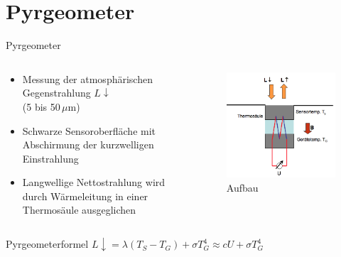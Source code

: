 \documentclass{beamer}
\begin{document}
\section{Pyrgeometer}
\begin{frame}{Pyrgeometer}
\begin{columns}
\begin{column}{0.6\textwidth}
\begin{itemize}
  \vfill\item Messung der atmosphärischen Gegenstrahlung $L\downarrow$\\
              (5 bis 50\,$\mu$m)
  \vfill\item Schwarze Sensoroberfläche mit Abschirmung der kurzwelligen Einstrahlung
  \vfill\item Langwellige Nettostrahlung wird durch Wärmeleitung in einer Thermosäule ausgeglichen
\vfill
\end{itemize}
\end{column}

\begin{column}{0.4\textwidth}
\begin{figure}[ht]
    \centering
    \includegraphics[width=1\textwidth]{figures/pyrgeometer_funktion.png}
    \caption{Aufbau}
    \label{fig:pyrgeometer_funktion}
\end{figure}
\end{column}
\end{columns}

\begin{alertblock}{Pyrgeometerformel}
  \centering$ L\downarrow = \lambda (T_S - T_G) + \sigma T_G^4 \approx cU + \sigma T_G^4 $
\end{alertblock}
\end{frame}
\end{document}
